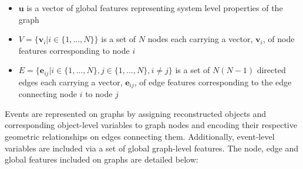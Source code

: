 \begin{itemize}
    \item $\textbf{u}$ is a vector of global features representing system level properties of the graph
    \item $V=\{\textbf{v}_i|i\in\{1,...,N\}\}$ is a set of $N$ nodes each carrying a vector, $\textbf{v}_i$, of node features corresponding to node $i$
    \item $E=\{\textbf{e}_{ij}|i\in\{1,...,N\},j\in\{1,...,N\}, i\neq j\}$ is a set of $N(N-1)$ directed edges each carrying a vector, $\textbf{e}_{ij}$, of edge features corresponding to the edge connecting node $i$ to node $j$ 
\end{itemize}
Events are represented on graphs by assigning reconstructed objects and corresponding object-level variables to graph nodes and encoding their respective geometric relationships on edges connecting them. Additionally, event-level variables are included via a set of global graph-level features. The node, edge and global features included on graphs are detailed below:

